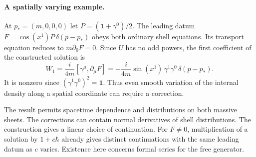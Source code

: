 \documentclass[11pt]{article}
\newcommand{\id}{\mathbf 1}
\begin{document}
\paragraph{A spatially varying example.}
At $p_*=(m,0,0,0)$ let $P=(\id+\gamma^0)/2$. The leading datum
$F=\cos(x^1)P\,\delta(p-p_*)$ obeys both ordinary shell equations. Its
transport equation reduces to $m\partial_0F=0$. Since $U$ has no odd powers,
the first coefficient of the constructed solution is
\[
 W_1=\frac{i}{4m}[\gamma^\mu,\partial_\mu F]
    =-\frac{i}{4m}\sin(x^1)\,\gamma^1\gamma^0\,\delta(p-p_*).
\]
It is nonzero since $(\gamma^1\gamma^0)^2=\id$. Thus even smooth variation of
the internal density along a spatial coordinate can require a correction.

\noindent
The result permits spacetime dependence and distributions on both massive sheets.
The corrections can contain normal derivatives of shell distributions. The
construction gives a linear choice of continuation. For $F\ne0$, multiplication
of a solution by $1+c\hbar$ already gives distinct continuations with the same
leading datum as $c$ varies. Existence here concerns formal series for the free
generator.
\end{document}
